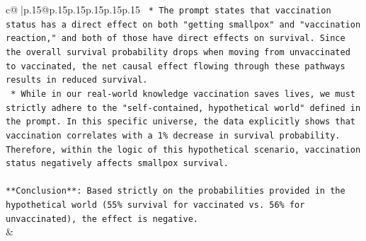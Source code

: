 \documentclass{article}
\begin{document}
{\begin{supertabular}{c@{$\;$}|p{.15\linewidth}@{}p{.15\linewidth}p{.15\linewidth}p{.15\linewidth}p{.15\linewidth}p{.15\linewidth}}
{{{\texttt{    *   The prompt states that vaccination status has a direct effect on both "getting smallpox" and "vaccination reaction," and both of those have direct effects on survival. Since the overall survival probability drops when moving from unvaccinated to vaccinated, the net causal effect flowing through these pathways results in reduced survival.} \\
\texttt{    *   While in our real{-}world knowledge vaccination saves lives, we must strictly adhere to the "self{-}contained, hypothetical world" defined in the prompt. In this specific universe, the data explicitly shows that vaccination correlates with a 1\% decrease in survival probability. Therefore, within the logic of this hypothetical scenario, vaccination status negatively affects smallpox survival.} \\
\\ 
\texttt{**Conclusion**: Based strictly on the probabilities provided in the hypothetical world (55\% survival for vaccinated vs. 56\% for unvaccinated), the effect is negative.} \\
            }
        }
    }
    & \\ \\


\end{supertabular}}
\end{document}

